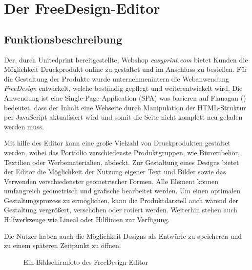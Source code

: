 \section{Der FreeDesign-Editor}
\label{Der FreeDesign-Editor}
\subsection{Funktionsbeschreibung}
Der, durch Unitedprint bereitgestellte, Webshop \emph{easyprint.com} bietet Kunden die Möglichkeit Druckprodukt online zu gestaltet und im Anschluss zu bestellen. Für die Gestaltung der Produkte wurde unternehmenintern die Webanwendung \emph{FreeDesign} entwickelt, welche beständig gepflegt und weiterentwickelt wird. Die Anwendung ist eine Single-Page-Application (SPA) was basieren auf Flanagan (\citeyear[S. 497]{Flanagan2006}) bedeutet, dass der Inhalt eine Webseite durch Manipulation der HTML-Struktur per JavaScript aktualisiert wird und somit die Seite nicht komplett neu geladen werden muss. 

Mit hilfe des Editor kann eine große Vielzahl von Druckprodukten gestaltet werden, wobei das Portfolio verschiedenste Produktgruppen, wie Bürozubehör, Textilien oder Werbematerialien, abdeckt. Zur Gestaltung eines Designs bietet der Editor die Möglichkeit der Nutzung eigener Text und Bilder sowie das Verwenden verschiedenster geometrischer Formen. Alle Element können umfangreich geometrisch und grafische bearbeitet werden. Um einen optimalen Gestaltungsprozess zu ermöglichen, kann die Produktdarstell auch wärend der Gestaltung vergrößert, verschoben oder rotiert werden. Weiterhin stehen auch Hilfwerkzeuge wie Lineal oder Hilflinien zur Verfügung. 

Die Nutzer haben auch die Möglichkeit Designs als Entwürfe zu speicheren und zu einem späteren Zeitpunkt zu öffnen.

\begin{figure}[H]
    \centering
    \caption{Ein Bildschirmfoto des FreeDesign-Editor}
    \label{fig:Der FreeDesign-Editor}
\end{figure}

